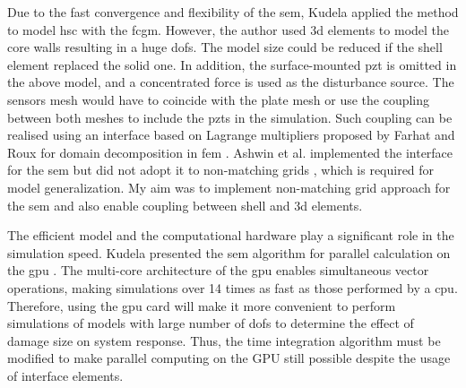 Due to the fast convergence and flexibility of the \ac{sem}, Kudela \cite{kudela2016parallel} applied the method to model \ac{hsc} with the \ac{fcgm}.
However, the author used \ac{3d} elements to model the core walls resulting in a huge \acp{dof}.
The model size could be reduced if the shell element replaced the solid one.
In addition, the surface-mounted \ac{pzt} is omitted in the above model, and a concentrated force is used as the disturbance source.
The sensors mesh would have to coincide with the plate mesh or use the coupling between both meshes to include the \acp{pzt} in the simulation.
Such coupling can be realised using an interface based on Lagrange multipliers proposed by Farhat and Roux for domain decomposition in \ac{fem} \cite{farhat1991method}.
Ashwin et al. implemented the interface for the \ac{sem} but did not adopt it to non-matching grids \cite{ashwin2014formulation}, which is required for model generalization.
My aim was to implement non-matching grid approach for the \ac{sem} and also enable coupling between shell and \ac{3d} elements.

The efficient model and the computational hardware play a significant role in the simulation speed. 
Kudela presented the \ac{sem} algorithm for parallel calculation on the \ac{gpu} \cite{kudela2016parallel}.
The multi-core architecture of the \ac{gpu} enables simultaneous vector operations, making simulations over 14 times as fast as those performed by a \ac{cpu}.
Therefore, using the \ac{gpu} card will make it more convenient to perform simulations of models with large number of \acp{dof} to determine the effect of damage size on system response.
Thus, the time integration algorithm must be modified to make parallel computing on the GPU still possible despite the usage of interface elements.
